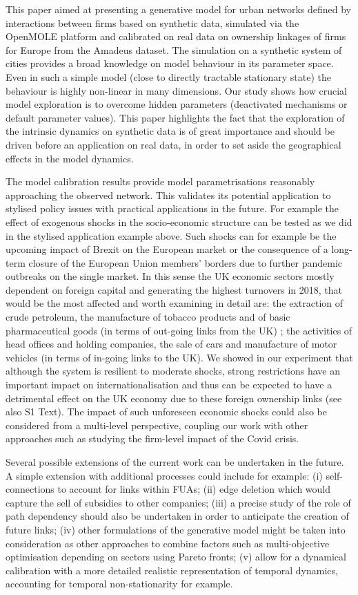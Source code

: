 \documentclass[10pt,letterpaper]{article}
\begin{document}
This paper aimed at presenting a generative model for urban networks defined by interactions between firms based on synthetic data, simulated via the OpenMOLE platform and calibrated on real data on ownership linkages of firms for Europe from the Amadeus dataset. The simulation on a synthetic system of cities provides a broad knowledge on model behaviour in its parameter space. Even in such a simple model (close to directly tractable stationary state) the behaviour is highly non-linear in many dimensions. Our study shows how crucial model exploration is to overcome hidden parameters (deactivated mechanisms or default parameter values). This paper highlights the fact that the exploration of the intrinsic dynamics on synthetic data is of great importance and should be driven before an application on real data, in order to set aside the geographical effects in the model dynamics.

The model calibration results provide model parametrisations reasonably approaching the observed network. This validates its potential application to stylised policy issues with practical applications in the future. For example the effect of exogenous shocks in the socio-economic structure can be tested as we did in the stylised application example above. Such shocks can for example be the upcoming impact of Brexit on the European market or the consequence of a long-term closure of the European Union members' borders due to further pandemic outbreaks on the single market. In this sense the UK economic sectors mostly dependent on foreign capital and generating the highest turnovers in 2018, that would be the most affected and worth examining in detail are: the extraction of crude petroleum, the manufacture of tobacco products and of basic pharmaceutical goods (in terms of out-going links from the UK) ; the activities of head offices and holding companies, the sale of cars and manufacture of motor vehicles (in terms of in-going links to the UK). We showed in our experiment that although the system is resilient to moderate shocks, strong restrictions have an important impact on internationalisation and thus can be expected to have a detrimental effect on the UK economy due to these foreign ownership links (see also S1 Text). The impact of such unforeseen economic shocks could also be considered from a multi-level perspective, coupling our work with other approaches such as \cite{Dorretal2022} studying the firm-level impact of the Covid crisis.

Several possible extensions of the current work can be undertaken in the future. A simple extension with additional processes could include for example: (i) self-connections to account for links within FUAs; (ii) edge deletion which would capture the sell of subsidies to other companies; (iii) a precise study of the role of path dependency should also be undertaken in order to anticipate the creation of future links; (iv) other formulations of the generative model might be taken into consideration as other approaches to combine factors such as multi-objective optimisation depending on sectors using Pareto fronts; (v) allow for a dynamical calibration with a more detailed realistic representation of temporal dynamics, accounting for temporal non-stationarity for example.
\end{document}
